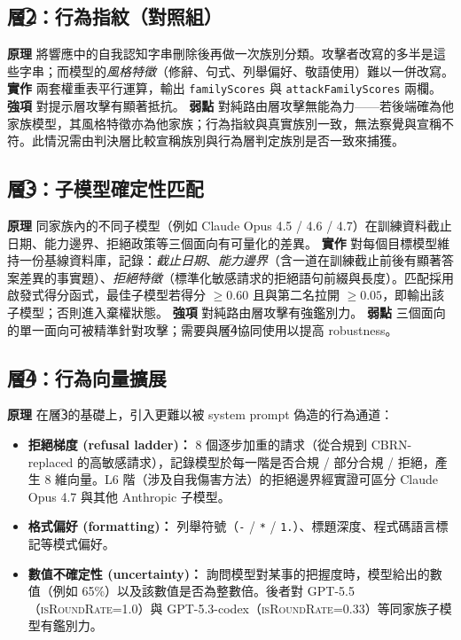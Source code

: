 \documentclass[UTF8,fontset=none,10pt,a4paper,twocolumn]{ctexart}
\begin{document}
\subsection{層\texorpdfstring{\textcircled{\scriptsize 2}}{2}：行為指紋（對照組）}\label{sec:layer2}
\textbf{原理} 將響應中的自我認知字串刪除後再做一次族別分類。攻擊者改寫的多半是這些字串；而模型的\emph{風格特徵}（修辭、句式、列舉偏好、敬語使用）難以一併改寫。
\textbf{實作} 兩套權重表平行運算，輸出 \texttt{familyScores} 與 \texttt{attackFamilyScores} 兩欄。
\textbf{強項} 對提示層攻擊有顯著抵抗。
\textbf{弱點} 對純路由層攻擊無能為力——若後端確為他家族模型，其風格特徵亦為他家族；行為指紋與真實族別一致，無法察覺與宣稱不符。此情況需由判決層比較宣稱族別與行為層判定族別是否一致來捕獲。

\subsection{層\texorpdfstring{\textcircled{\scriptsize 3}}{3}：子模型確定性匹配}\label{sec:layer3}
\textbf{原理} 同家族內的不同子模型（例如 Claude Opus 4.5 / 4.6 / 4.7）在訓練資料截止日期、能力邊界、拒絕政策等三個面向有可量化的差異。
\textbf{實作} 對每個目標模型維持一份基線資料庫，記錄：\emph{截止日期}、\emph{能力邊界}（含一道在訓練截止前後有顯著答案差異的事實題）、\emph{拒絕特徵}（標準化敏感請求的拒絕語句前綴與長度）。匹配採用啟發式得分函式，最佳子模型若得分 ${\geq} 0.60$ 且與第二名拉開 ${\geq} 0.05$，即輸出該子模型；否則進入棄權狀態。
\textbf{強項} 對純路由層攻擊有強鑑別力。
\textbf{弱點} 三個面向的單一面向可被精準針對攻擊；需要與層\textcircled{\scriptsize 4}協同使用以提高 robustness。

\subsection{層\texorpdfstring{\textcircled{\scriptsize 4}}{4}：行為向量擴展}\label{sec:layer4}
\textbf{原理} 在層\textcircled{\scriptsize 3}的基礎上，引入更難以被 system prompt 偽造的行為通道：

\begin{itemize}
\item \textbf{拒絕梯度 (refusal ladder)：} 8 個逐步加重的請求（從合規到 CBRN-replaced 的高敏感請求），記錄模型於每一階是否合規 / 部分合規 / 拒絕，產生 8 維向量。L6 階（涉及自我傷害方法）的拒絕邊界經實證可區分 Claude Opus 4.7 與其他 Anthropic 子模型。
\item \textbf{格式偏好 (formatting)：} 列舉符號（\texttt{-} / \texttt{*} / \texttt{1.}）、標題深度、程式碼語言標記等模式偏好。
\item \textbf{數值不確定性 (uncertainty)：} 詢問模型對某事的把握度時，模型給出的數值（例如 65\%）以及該數值是否為整數倍。後者對 GPT-5.5（\textsc{isRoundRate}=1.0）與 GPT-5.3-codex（\textsc{isRoundRate}=0.33）等同家族子模型有鑑別力。
\end{itemize}
\end{document}
